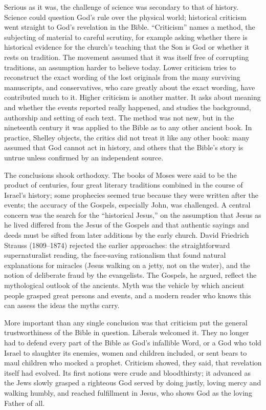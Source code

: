 Serious as it was, the challenge of science was secondary to that of history. Science could question
God's rule over the physical world; historical criticism went straight to God's revelation in the
Bible. ``Criticism'' names a method, the subjecting of material to careful scrutiny, for example
asking whether there is historical evidence for the church's teaching that the Son is God or whether
it rests on tradition. The movement assumed that it was itself free of corrupting traditions, an
assumption harder to believe today. Lower criticism tries to reconstruct the exact wording of the
lost originals from the many surviving manuscripts, and conservatives, who care greatly about the
exact wording, have contributed much to it. Higher criticism is another matter. It asks about meaning
and whether the events reported really happened, and studies the background, authorship and setting
of each text. The method was not new, but in the nineteenth century it was applied to the Bible as
to any other ancient book. In practice, Shelley objects, the critics did not treat it like any other
book: many assumed that God cannot act in history, and others that the Bible's story is untrue unless
confirmed by an independent source.

The conclusions shook orthodoxy. The books of Moses were said to be the product of centuries, four
great literary traditions combined in the course of Israel's history; some prophecies seemed true
because they were written after the events; the accuracy of the Gospels, especially John, was
challenged. A central concern was the search for the ``historical Jesus,'' on the assumption that
Jesus as he lived differed from the Jesus of the Gospels and that authentic sayings and deeds must be
sifted from later additions by the early church. David Friedrich Strauss (1809--1874) rejected the
earlier approaches: the straightforward supernaturalist reading, the face-saving rationalism that
found natural explanations for miracles (Jesus walking on a jetty, not on the water), and the notion
of deliberate fraud by the evangelists. The Gospels, he argued, reflect the mythological outlook of
the ancients. Myth was the vehicle by which ancient people grasped great persons and events, and a
modern reader who knows this can assess the ideas the myths carry.

More important than any single conclusion was that criticism put the general trustworthiness of the
Bible in question. Liberals welcomed it. They no longer had to defend every part of the Bible as God's infallible Word, or a God who told Israel to slaughter its enemies, women and children included, or sent bears to maul children who mocked a prophet. Criticism showed, they said, that revelation itself had evolved. Its first notions were crude and bloodthirsty; it advanced as
the Jews slowly grasped a righteous God served by doing justly, loving mercy and walking humbly, and
reached fulfillment in Jesus, who shows God as the loving Father of all.

